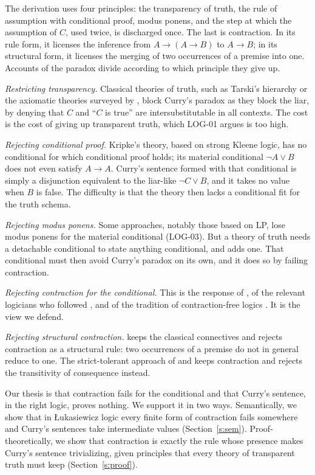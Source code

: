 \documentclass{situationist-preprint}
\begin{document}
The derivation uses four principles: the transparency of truth, the rule of assumption with conditional proof, modus ponens, and the step at which the assumption of $C$, used twice, is discharged once. The last is contraction. In its rule form, it licenses the inference from $A \to (A \to B)$ to $A \to B$; in its structural form, it licenses the merging of two occurrences of a premise into one. Accounts of the paradox divide according to which principle they give up.

\emph{Restricting transparency.} Classical theories of truth, such as Tarski's hierarchy or the axiomatic theories surveyed by \citet{Halbach2011}, block Curry's paradox as they block the liar, by denying that $C$ and \enquote{$C$ is true} are intersubstitutable in all contexts. The cost is the cost of giving up transparent truth, which LOG-01 argues is too high.

\emph{Rejecting conditional proof.} Kripke's theory, based on strong Kleene logic, has no conditional for which conditional proof holds; its material conditional $\neg A \vee B$ does not even satisfy $A \to A$. Curry's sentence formed with that conditional is simply a disjunction equivalent to the liar-like $\neg C \vee B$, and it takes no value when $B$ is false. The difficulty is that the theory then lacks a conditional fit for the truth schema.

\emph{Rejecting modus ponens.} Some approaches, notably those based on LP, lose modus ponens for the material conditional (LOG-03). But a theory of truth needs a detachable conditional to state anything conditional, and \citet{Priest2006} adds one. That conditional must then avoid Curry's paradox on its own, and it does so by failing contraction.

\emph{Rejecting contraction for the conditional.} This is the response of \citet{Field2008}, of the relevant logicians who followed \citet{MeyerRoutleyDunn1979}, and of the tradition of contraction-free logics \citep{Restall1993,Petersen2000}. It is the view we defend.

\emph{Rejecting structural contraction.} \citet{Zardini2011} keeps the classical connectives and rejects contraction as a structural rule: two occurrences of a premise do not in general reduce to one. The strict-tolerant approach of \citet{CobrerosEtAl2013} and \citet{Ripley2013} keeps contraction and rejects the transitivity of consequence instead.

Our thesis is that contraction fails for the conditional and that Curry's sentence, in the right logic, proves nothing. We support it in two ways. Semantically, we show that in Łukasiewicz logic every finite form of contraction fails somewhere and Curry's sentences take intermediate values (Section~\ref{s:sem}). Proof-theoretically, we show that contraction is exactly the rule whose presence makes Curry's sentence trivializing, given principles that every theory of transparent truth must keep (Section~\ref{s:proof}).
\end{document}
